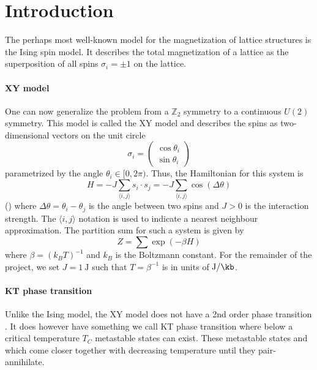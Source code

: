 \section{Introduction}
The perhaps most well-known model for the magnetization of lattice structures is the Ising spin model. It describes the total magnetization of a lattice as the superposition of all spins $\sigma_i = \pm 1$ on the lattice.

\paragraph{XY model}
One can now generalize the problem from a $\mathbb{Z}_2$ symmetry to a continuous $U(2)$ symmetry. This model is called the XY model and describes the spins as two-dimensional vectors on the unit circle
\begin{equation}\label{eq:hamiltonian}
	\sigma_i = \begin{pmatrix}
		\cos{\theta_i} \\ \sin{\theta_i}
	\end{pmatrix}
\end{equation}
parametrized by the angle $\theta_i \in [0,2\pi)$. Thus, the Hamiltonian for this system is
\begin{equation}\label{eq:partition}
	H = -J \sum_{\langle i,j \rangle}{s_i \cdot s_j} = -J \sum_{\langle i,j \rangle}{\cos{(\Delta \theta)}}
\end{equation}
(\citet[p. 1190, eq. (42)]{kt}) where $\Delta \theta = \theta_i - \theta_j$ is the angle between two spins and $J > 0$ is the interaction strength. The $\langle i,j \rangle$ notation is used to indicate a nearest neighbour approximation. The partition sum for such a system is given by
\begin{equation}
	Z = \sum{\exp{(-\beta H)}}
\end{equation}
where $\beta = (k_B T)^{-1}$ and $k_B$ is the Boltzmann constant.  For the remainder of the project, we set $J = \SI{1}{\joule}$ such that $T = \beta^{-1}$ is in units of $\si{\J\per\kb}$.

\paragraph{KT phase transition}
Unlike the Ising model, the XY model does not have a 2nd order phase transition . It does however have something we call KT phase transition where below a critical temperature $T_C$ metastable states can exist. These metastable states  and which come closer together with decreasing temperature until they pair-annihilate.